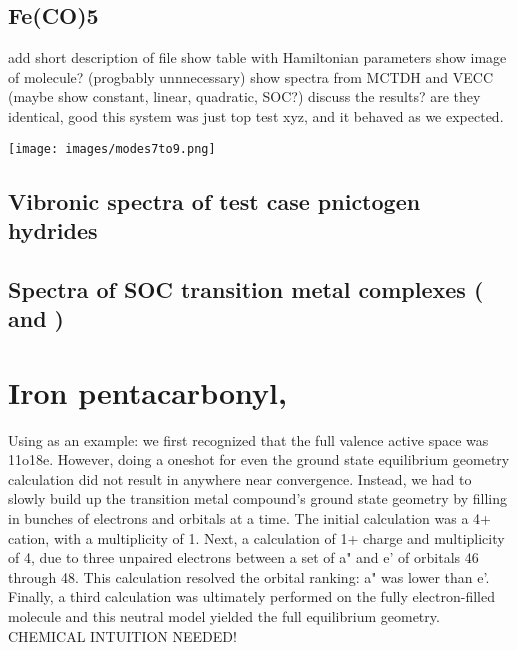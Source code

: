 \documentclass[letterpaper, 12pt, oneside]{report}
\begin{document}
\subsection{Fe(CO)5}
add short description of file
show table with Hamiltonian parameters
show image of molecule? (progbably unnnecessary)
show spectra from MCTDH and VECC (maybe show constant, linear, quadratic, SOC?)
discuss the results? are they identical, good this system was just top test xyz, and it behaved as we expected.

\texttt{[image: images/modes7to9.png]}


\subsection{Vibronic spectra of test case pnictogen hydrides}

\subsection{Spectra of  SOC transition metal complexes ( and )}


\section{Iron pentacarbonyl, }
    Using  as an example: we first recognized that the full valence active space was 11o18e. However, doing a oneshot for even the ground state equilibrium geometry calculation did not result in anywhere near convergence. Instead, we had to slowly build up the transition metal compound's ground state geometry by filling in bunches of electrons and orbitals at a time. The initial calculation was a 4+ cation, with a multiplicity of 1. Next, a calculation of 1+ charge and multiplicity of 4, due to three unpaired electrons between a set of a" and e' of orbitals 46 through 48. This calculation resolved the orbital ranking: a" was lower than e'. Finally, a third calculation was ultimately performed on the fully electron-filled molecule and this neutral model yielded the full equilibrium geometry. CHEMICAL INTUITION NEEDED!
    
\end{document}
